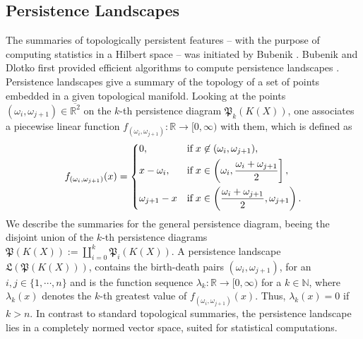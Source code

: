 \documentclass[envcountsect,runningheads]{llncs}
\begin{document}
\subsection{Persistence Landscapes}
The summaries of topologically persistent features -- with the purpose of computing statistics in a Hilbert space -- was initiated by Bubenik . Bubenik and Dlotko first provided efficient algorithms to compute persistence landscapes . Persistence landscapes give a summary of the topology of a set of points embedded in a given topological manifold. Looking at the points $(\omega_i,\omega_{j+1}) \in \overline{\mathbb{R}^2}$ on the $k$-th persistence diagram $\mathfrak{P}_k(K(X))$, one associates a piecewise linear function $f_{(\omega_i,\omega_{j+1})}: \mathbb{R} \rightarrow [0,\infty)$ with them, which is defined as
\[
    f_{(\omega_i,\omega_{j+1})}(x) =
\begin{dcases}
    0,
    & \text{if} \; x \not\in (\omega_i,\omega_{j+1}),\\
    x - \omega_{i},
    & \text{if} \; x \in \left(\omega_{i},\frac{\omega_i + \omega_{j+1}}{2} \right],\\
    \omega_{j+1} - x 
    & \text{if} \; x \in \left(\frac{\omega_i + \omega_{j+1}}{2},\omega_{j+1} \right).
\end{dcases}
\]
We describe the summaries for the general persistence diagram, beeing the disjoint union of the $k$-th persistence diagrams $\mathfrak{P}(K(X)) := \coprod_{i=0}^{k} \mathfrak{P}_i(K(X))$. A persistence landscape $\mathfrak{L}(\mathfrak{P}(K(X)))$, contains the birth-death pairs $(\omega_i,\omega_{j+1})$, for an $i,j \in \{1, \cdots, n\}$ and is the function sequence $\lambda_k : \mathbb{R} \rightarrow [0,\infty)$ for a $k \in \mathbb{N}$, where $\lambda_k(x)$ denotes the $k$-th greatest value of $f_{(\omega_i,\omega_{j+1})}(x)$. Thus, $\lambda_k(x) = 0$ if $k > n$. In contrast to standard topological summaries, the persistence landscape lies in a completely normed vector space, suited for statistical computations.
\end{document}
